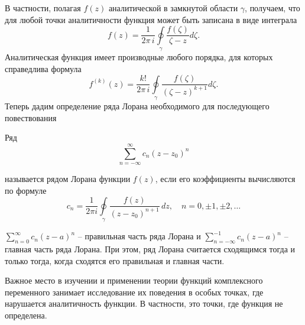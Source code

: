В частности, полагая $f(z)$ аналитической в замкнутой области $\gamma$, получаем, что для любой точки аналитичности функция может быть записана в виде интеграла
$$
f(z)=\dfrac{1}{2\pi\,i}\oint\limits_{\gamma}\dfrac{f(\zeta)}{\zeta-z}d\zeta.
$$
Аналитическая функция имеет производные любого порядка, для которых справедлива формула
$$
f^{(k)}(z)=\dfrac{k!}{2\pi\,i}\oint\limits_{\gamma}\dfrac{f(\zeta)}{(\zeta-z)^{k+1}}d\zeta.
$$
Теперь дадим определение ряда Лорана необходимого для последующего повествования
\begin{definition}\label{ch1.lor}
Ряд 
\begin{equation}
\sum_{n=-\infty}^{\infty} c_n(z-z_0)^n
\end{equation}

называется рядом Лорана функции $f(z)$, если его коэффициенты вычисляются по формуле
$$
c_n= \frac{1}{2\pi i} \oint\limits_{\gamma} \frac{f(z)}{(z-z_0)^{n+1}}\,dz,\quad n=0,\pm1,\pm2,\ldots
$$
\end{definition}
\begin{remark}
$\sum_{n=0}^{\infty}c_n(z-a)^n$ -- правильная часть ряда Лорана и
$\sum_{n=-\infty}^{-1}{c_{n}}{(z-a)^n}$ -- главная часть ряда Лорана.
При этом, ряд Лорана считается сходящимся тогда и только тогда, когда сходятся его правильная и главная части.
\end{remark}
Важное место в изучении и применении теории функций комплексного переменного занимает исследование их поведения в особых точках, где нарушается аналитичность функции. В частности, это точки, где функция не определена.

